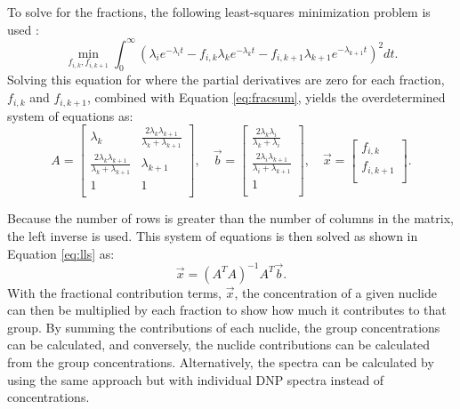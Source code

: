 To solve for the fractions, the following least-squares minimization problem is used \cite{brady1988evaluation}:
\begin{equation}
    \min_{f_{i,k}, f_{i,k+1}} \int_{0}^{\infty} \left( \lambda_i e^{-\lambda_i t} -  f_{i, k} \lambda_k e^{-\lambda_k t} - f_{i, k+1} \lambda_{k+1} e^{-\lambda_{k+1} t}   \right)^2 dt.
    \label{eq:fracmin}
\end{equation}
Solving this equation for where the partial derivatives are zero for each fraction, $f_{i, k}$ and $f_{i, k+1}$, combined with Equation \eqref{eq:fracsum}, yields the overdetermined system of equations as:
\renewcommand{\arraystretch}{2}
\begin{equation}
A = \begin{bmatrix}
    \lambda_k & \frac{2 \lambda_k \lambda_{k+1}}{\lambda_k + \lambda_{k+1}} \\
    \frac{2 \lambda_k \lambda_{k+1}}{\lambda_k + \lambda_{k+1}} & \lambda_{k+1} \\
    1 & 1\\
\end{bmatrix}, \quad
\vec{b} = \begin{bmatrix}
    \frac{2 \lambda_k \lambda_{i}}{\lambda_k + \lambda_i}\\
    \frac{2 \lambda_i \lambda_{k+1}}{\lambda_i + \lambda_{k+1}} \\
    1\\
\end{bmatrix}, \quad
\vec{x} = \begin{bmatrix}
    f_{i, k} \\
    f_{i, k+1} \\
\end{bmatrix}.
\label{eq:fracmats}
\end{equation}
\renewcommand{\arraystretch}{1}

Because the number of rows is greater than the number of columns in the matrix, the left inverse is used. This system of equations is then solved as shown in Equation \eqref{eq:lls} as:
\begin{equation}
\vec{x} = (A^T A)^{-1} A^T\vec{b}.
\label{eq:lls}
\end{equation}
With the fractional contribution terms, $\vec{x}$, the concentration of a given nuclide can then be multiplied by each fraction to show how much it contributes to that group.
By summing the contributions of each nuclide, the group concentrations can be calculated, and conversely, the nuclide contributions can be calculated from the group concentrations.
Alternatively, the spectra can be calculated by using the same approach but with individual \gls{DNP} spectra instead of concentrations.

